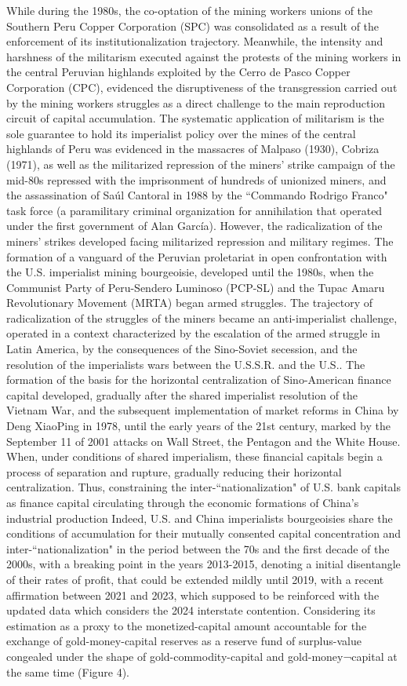 \documentclass[]{interact}
\theoremstyle{plain}%
\theoremstyle{definition}
\theoremstyle{remark}
\begin{document}
While during the 1980s, the co-optation of the mining workers unions of the Southern Peru Copper Corporation (SPC) was consolidated as a result of the enforcement of its institutionalization trajectory. Meanwhile, the intensity and harshness of the militarism executed against the protests of the mining workers in the central Peruvian highlands exploited by the Cerro de Pasco Copper Corporation (CPC), evidenced the disruptiveness of the transgression carried out by the mining workers struggles as a direct challenge to the main reproduction circuit of capital accumulation. The systematic application of militarism is the sole guarantee to hold its imperialist policy over the mines of the central highlands of Peru was evidenced in the massacres of Malpaso (1930), Cobriza (1971), as well as the militarized repression of the miners' strike campaign of the mid-80s repressed with the imprisonment of hundreds of unionized miners, and the assassination of Saúl Cantoral in 1988 by the “Commando Rodrigo Franco" task force (a paramilitary criminal organization for annihilation that operated under the first government of Alan García).
However, the radicalization of the miners' strikes developed facing militarized repression and military regimes. The formation of a vanguard of the Peruvian proletariat in open confrontation with the U.S. imperialist mining bourgeoisie, developed until the 1980s, when the Communist Party of Peru-Sendero Luminoso (PCP-SL) and the Tupac Amaru Revolutionary Movement (MRTA) began armed struggles. The trajectory of radicalization of the struggles of the miners became an anti-imperialist challenge, operated in a context characterized by the escalation of the armed struggle in Latin America, by the consequences of the Sino-Soviet secession, and the resolution of the imperialists wars between the U.S.S.R. and the U.S.. The formation of the basis for the horizontal centralization of Sino-American finance capital developed, gradually after the shared imperialist resolution of the Vietnam War, and the subsequent implementation of market reforms in China by Deng XiaoPing in 1978, until the early years of the 21st century, marked by the September 11 of 2001 attacks on Wall Street, the Pentagon and the White House. When, under conditions of shared imperialism, these financial capitals begin a process of separation and rupture, gradually reducing their horizontal centralization. Thus, constraining the inter-“nationalization" of U.S. bank capitals as finance capital circulating through the economic formations of China's industrial production
Indeed, U.S. and China imperialists bourgeoisies share the conditions of accumulation for their mutually consented capital concentration and inter-“nationalization" in the period between the 70s and the first decade of the 2000s, with a breaking point in the years 2013-2015, denoting a initial disentangle of their rates of profit, that could be extended mildly until 2019, with a recent affirmation between 2021 and 2023, which supposed to be reinforced with the updated data which considers the 2024 interstate contention. Considering its estimation as a proxy to the monetized-capital amount accountable for the exchange of gold-money-capital reserves as a reserve fund of surplus-value congealed under the shape of gold-commodity-capital and gold-money¬capital at the same time (Figure 4).
\end{document}
